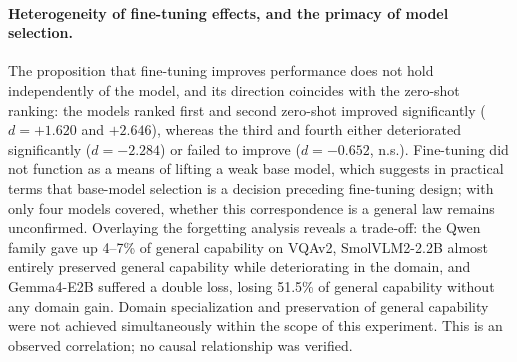 \paragraph{Heterogeneity of fine-tuning effects, and the primacy of model
selection.}
The proposition that fine-tuning improves performance does not hold independently
of the model, and its direction coincides with the zero-shot ranking: the models
ranked first and second zero-shot improved significantly ($d = +1.620$ and
$+2.646$), whereas the third and fourth either deteriorated significantly
($d = -2.284$) or failed to improve ($d = -0.652$, n.s.). Fine-tuning did not
function as a means of lifting a weak base model, which suggests in practical
terms that base-model selection is a decision preceding fine-tuning design; with
only four models covered, whether this correspondence is a general law remains
unconfirmed. Overlaying the forgetting analysis reveals a trade-off: the Qwen
family gave up 4--7\% of general capability on VQAv2, SmolVLM2-2.2B almost
entirely preserved general capability while deteriorating in the domain, and
Gemma4-E2B suffered a double loss, losing 51.5\% of general capability without
any domain gain. Domain specialization and preservation of general capability
were not achieved simultaneously within the scope of this experiment. This is an
observed correlation; no causal relationship was verified.

